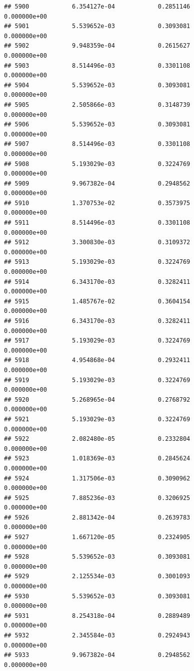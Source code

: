 \documentclass[
]{article}
\begin{document}
\begin{verbatim}
## 5900            6.354127e-04            0.2851146            0.000000e+00
## 5901            5.539652e-03            0.3093081            0.000000e+00
## 5902            9.948359e-04            0.2615627            0.000000e+00
## 5903            8.514496e-03            0.3301108            0.000000e+00
## 5904            5.539652e-03            0.3093081            0.000000e+00
## 5905            2.505866e-03            0.3148739            0.000000e+00
## 5906            5.539652e-03            0.3093081            0.000000e+00
## 5907            8.514496e-03            0.3301108            0.000000e+00
## 5908            5.193029e-03            0.3224769            0.000000e+00
## 5909            9.967382e-04            0.2948562            0.000000e+00
## 5910            1.370753e-02            0.3573975            0.000000e+00
## 5911            8.514496e-03            0.3301108            0.000000e+00
## 5912            3.300830e-03            0.3109372            0.000000e+00
## 5913            5.193029e-03            0.3224769            0.000000e+00
## 5914            6.343170e-03            0.3282411            0.000000e+00
## 5915            1.485767e-02            0.3604154            0.000000e+00
## 5916            6.343170e-03            0.3282411            0.000000e+00
## 5917            5.193029e-03            0.3224769            0.000000e+00
## 5918            4.954868e-04            0.2932411            0.000000e+00
## 5919            5.193029e-03            0.3224769            0.000000e+00
## 5920            5.268965e-04            0.2768792            0.000000e+00
## 5921            5.193029e-03            0.3224769            0.000000e+00
## 5922            2.082480e-05            0.2332804            0.000000e+00
## 5923            1.018369e-03            0.2845624            0.000000e+00
## 5924            1.317506e-03            0.3090962            0.000000e+00
## 5925            7.885236e-03            0.3206925            0.000000e+00
## 5926            2.881342e-04            0.2639783            0.000000e+00
## 5927            1.667120e-05            0.2324905            0.000000e+00
## 5928            5.539652e-03            0.3093081            0.000000e+00
## 5929            2.125534e-03            0.3001093            0.000000e+00
## 5930            5.539652e-03            0.3093081            0.000000e+00
## 5931            8.254318e-04            0.2889489            0.000000e+00
## 5932            2.345584e-03            0.2924943            0.000000e+00
## 5933            9.967382e-04            0.2948562            0.000000e+00

\end{verbatim}
\end{document}
